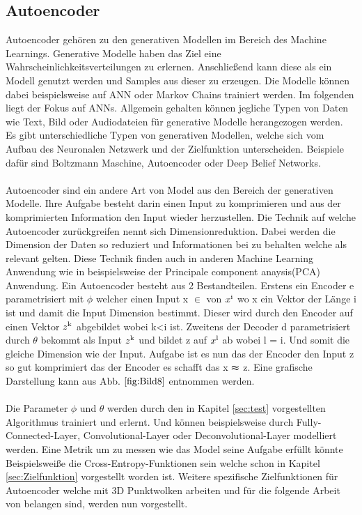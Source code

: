 \documentclass{llncs}
\begin{document}
\subsection{Autoencoder}\label{sec:autoencoder}

Autoencoder gehören zu den generativen Modellen im Bereich des Machine Learnings. Generative Modelle haben das Ziel eine Wahrscheinlichkeitsverteilungen zu erlernen. Anschließend kann diese als ein Modell genutzt werden und Samples aus dieser zu erzeugen. Die Modelle können dabei beispielsweise auf ANN oder Markov Chains trainiert werden\cite{Grundlagen}. Im folgenden liegt der Fokus auf ANNs. Allgemein gehalten können jegliche Typen von Daten wie Text, Bild oder Audiodateien für generative Modelle herangezogen werden. Es gibt unterschiedliche Typen von generativen Modellen, welche sich vom Aufbau des Neuronalen Netzwerk und der Zielfunktion unterscheiden. Beispiele dafür sind Boltzmann Maschine, Autoencoder oder Deep Belief Networks\cite{Grundlagen}. 
\\\\
Autoencoder sind ein andere Art von Model aus den Bereich der generativen Modelle. Ihre Aufgabe besteht darin einen Input zu komprimieren und aus der komprimierten Information den Input wieder herzustellen. Die Technik auf welche Autoencoder zurückgreifen nennt sich Dimensionreduktion. Dabei werden die Dimension der Daten so reduziert und Informationen bei zu behalten welche als relevant gelten. Diese Technik finden auch in anderen Machine Learning Anwendung wie in beispielsweise der Principale component anaysis(PCA) Anwendung\cite{dimreduction}.  Ein Autoencoder besteht aus 2 Bestandteilen. Erstens ein Encoder e parametrisiert mit $\phi$ welcher einen Input x $\in$ von $x\textsuperscript{i}$ wo x ein Vektor der Länge i ist und damit die Input Dimension bestimmt. Dieser wird durch den Encoder auf einen Vektor $z\textsuperscript{k}$ abgebildet wobei k<i ist. Zweitens der Decoder d parametrisiert durch  $\theta$ bekommt als Input $z\textsuperscript{k}$ und bildet z auf $x\textsuperscript{l}$ ab wobei l = i. Und somit die gleiche Dimension wie der Input. Aufgabe ist es nun das der Encoder den Input z so gut komprimiert das der Encoder es schafft das x $\thickapprox$ z. Eine grafische Darstellung kann aus Abb. $\ref{fig:Bild8}$ entnommen werden\cite{Grundlagen}. 
\\\\
Die Parameter $\phi$ und $\theta$ werden durch den in Kapitel \ref{sec:test} vorgestellten Algorithmus trainiert und erlernt. Und können beispielsweise durch Fully-Connected-Layer, Convolutional-Layer oder Deconvolutional-Layer modelliert werden. Eine Metrik um zu messen wie das Model seine Aufgabe erfüllt könnte Beispielsweiße die Cross-Entropy-Funktionen sein welche schon in Kapitel \ref{sec:Zielfunktion} vorgestellt worden ist. Weitere spezifische Zielfunktionen für Autoencoder welche mit 3D Punktwolken arbeiten und für die folgende Arbeit von belangen sind, werden nun vorgestellt.
\end{document}
